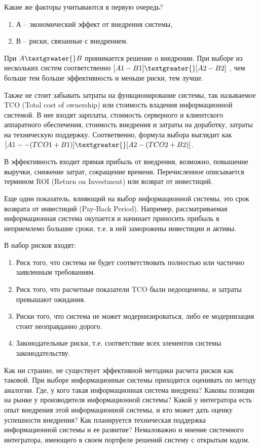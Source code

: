 \documentclass[10pt, a5paper]{article}
\begin{document}
Какие же факторы учитываются в первую очередь?

\begin{enumerate}
  \item А -- экономический эффект от внедрения системы,
  \item В – риски, связанные с внедрением.
\end{enumerate}

При $A \textgreater{} B$  принимается решение о внедрении. При выборе из нескольких систем соответственно $[A1-B1]\textgreater{}[A2-B2]$ , чем больше тем больше эффективность и меньше риски, тем лучше.

Также не стоит забывать затраты на функционирование системы, так называемое TCO (Total cost of ownership) или стоимость владения информационной системой. В нее входят зарплаты, стоимость серверного и клиентского аппаратного обеспечения, стоимость внедрения и затраты на доработку, затраты на техническую поддержку.
Соответвенно, формула выбора выглядит как $[A1 -- (TCO1 + B1)] \textgreater{} [A2-(TCO2 + B2)]$.

В эффективность входит прямая прибыль от внедрения, возможно, повышение выручки, снижение затрат, сокращение времени.
Перечисленное описывается термином ROI (Return on Investment) или возврат от инвестиций.

Еще один показатель, влияющий на выбор информационной системы, это срок возврата от инвестиций (Pay-Back Period). Например, рассматриваемая информационная система окупается и начинает приносить прибыль в неприемлемо большие сроки, т.е. в ней заморожены инвестиции и активы.

В набор рисков входят:

\begin{enumerate}
  \item Риск того, что система не будет соответствовать полностью или частично заявленным требованиям.
  \item Риск того, что расчетные показатели TCO были недооценены, и затраты превышают ожидания.
  \item Риски того, что система не может модернизироваться, либо ее модернизация стоит неоправданно дорого.
  \item Законодательные риски, т.е. соответствие всех элементов системы законодательству.
\end{enumerate}

Как ни странно, не существует эффективной методики расчета рисков как таковой. При выборе информационные системы приходится оценивать по методу аналогии. Где, у кого такая информационная система внедрена? Каковы позиции на рынке у производителя информационной системы? Какой у интегратора есть опыт внедрения этой информационной системы, и кто может дать оценку успешности внедрения? Как планируется техническая поддержка информационной системы и ее развитие?
Немаловажно и мнение системного интегратора, имеющего в своем портфеле решений систему с открытым кодом.
\end{document}
